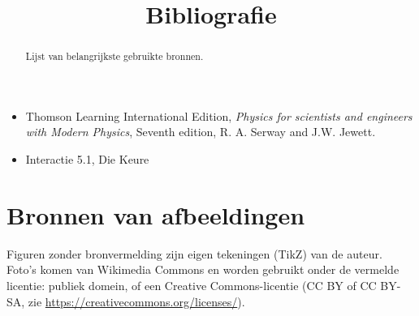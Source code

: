 \documentclass{ximera}
\title{Bibliografie}
\begin{document}
\begin{abstract}
    Lijst van belangrijkste gebruikte bronnen.
\end{abstract}
\maketitle
    

\begin{itemize}
    \item Thomson Learning International Edition, \textit{Physics for scientists and engineers with Modern Physics}, Seventh edition, R. A. Serway and J.W. Jewett.
 
    \item Interactie 5.1, Die Keure
\end{itemize}
 
 
 

\section*{Bronnen van afbeeldingen}
Figuren zonder bronvermelding zijn eigen tekeningen (TikZ) van de auteur. Foto's komen van Wikimedia Commons en worden gebruikt onder de vermelde licentie: publiek domein, of een Creative Commons-licentie (CC BY of CC BY-SA, zie \url{https://creativecommons.org/licenses/}).
\end{document}
